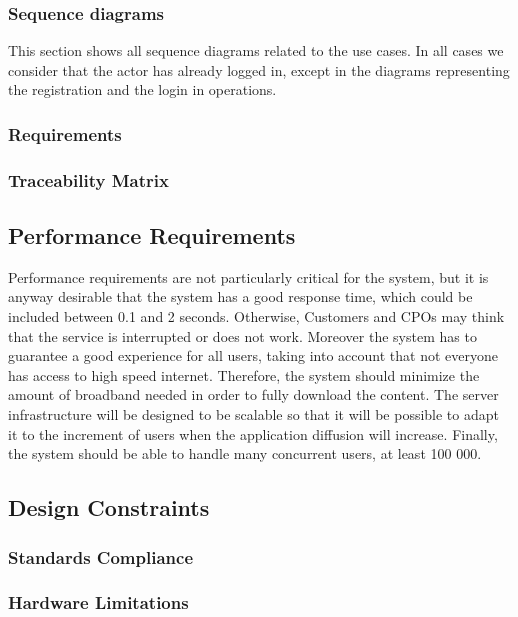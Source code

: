 \subsubsection{Sequence diagrams}
This section shows all sequence diagrams related to the use cases. In all cases we consider that the actor has already logged in, except in the diagrams representing the registration and the login in operations.




\subsubsection{Requirements}
\subsubsection{Traceability Matrix}
\subsection{Performance Requirements}

Performance requirements are not particularly critical for the system, but it is anyway desirable that the system has a good response time, which could be included between 0.1 and 2 seconds.
Otherwise, Customers and CPOs may think that the service is interrupted or does not work.
Moreover the system has to guarantee a good experience for all users, taking into account that not everyone has access to high speed internet. Therefore,
the system should minimize the amount of broadband needed in order to fully
download the content.
The server infrastructure will be designed to be scalable so that it will be possible to adapt it to
the increment of users when the application diffusion will increase.
Finally, the system should be able to handle many concurrent users, at least
100 000.
\subsection{Design Constraints}
\subsubsection{Standards Compliance}
\subsubsection{Hardware Limitations}
